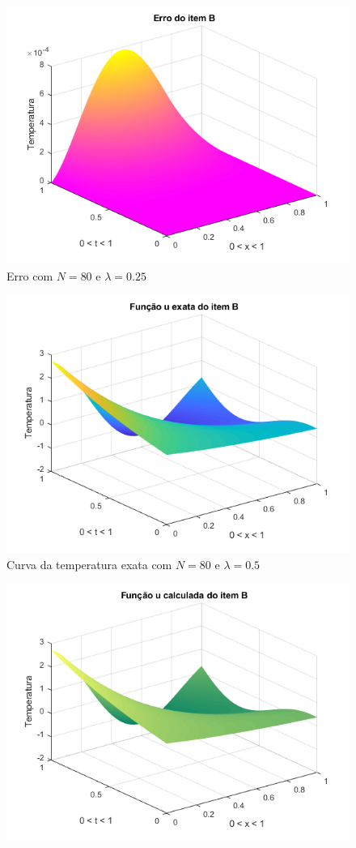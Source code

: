 \documentclass[12pt]{article}
\begin{document}
\begin{spacing}{1.5}
\begin{figure}
    \includegraphics[width=0.8\linewidth]{Primeira_Tarefa/ItemB/n80_lambda0-25_erro.png}
    \caption{Erro com $N=80$ e $\lambda=0.25$}
    \label{fig:B_n80lambda0-25_erro}
\end{figure}
\begin{figure}
    \centering
    \includegraphics[width=0.8\linewidth]{Primeira_Tarefa/ItemB/n80_lambda0-5_exata.png}
    \caption{Curva da temperatura exata com $N=80$ e $\lambda=0.5$}
    \label{fig:B_n80lambda0-5_exata}
\end{figure}
\begin{figure}
    \centering
    \includegraphics[width=0.8\linewidth]{Primeira_Tarefa/ItemB/n80_lambda0-5_calc.png}

\end{figure}
\end{spacing}
\end{document}
